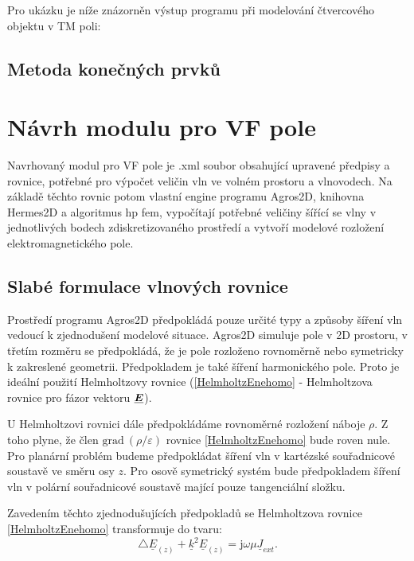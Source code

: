 \documentclass[12pt,a4paper,oneside]{article}
\numberwithin{equation}{section} %
\numberwithin{figure}{section} %
\numberwithin{table}{section} %
\newcommand{\mj}{\mathrm{j}} %
\renewcommand{\vec}[1]{\mbox{\boldmath$#1$}} %
\newcommand{\faz}[1]{{\underline{#1}}} %
\newcommand{\grad}{\mathrm{grad}\ }
\begin{document}
Pro ukázku je níže znázorněn výstup programu při modelování čtvercového objektu v TM poli:


\subsection{Metoda konečných prvků}
\label{FEM}

\newpage
\section{Návrh modulu pro VF pole}
Navrhovaný modul pro VF pole je .xml soubor obsahující upravené předpisy a rovnice, potřebné pro výpočet veličin vln ve volném prostoru a vlnovodech. Na základě těchto rovnic potom vlastní engine programu Agros2D, knihovna Hermes2D a algoritmus hp fem, vypočítají potřebné veličiny šířící se vlny v jednotlivých bodech zdiskretizovaného prostředí a vytvoří modelové rozložení elektromagnetického pole.

\subsection{Slabé formulace vlnových rovnice}
Prostředí programu Agros2D předpokládá pouze určité typy a způsoby šíření vln vedoucí k zjednodušení modelové situace. Agros2D simuluje pole v 2D prostoru, v třetím rozměru se předpokládá, že je pole rozloženo rovnoměrně nebo symetricky k zakreslené geometrii. Předpokladem je také šíření harmonického pole. Proto je ideální použití Helmholtzovy rovnice (\ref{HelmholtzEnehomo} - Helmholtzova rovnice pro fázor vektoru $\faz{\vec{E}}$).

U Helmholtzovi rovnici dále předpokládáme rovnoměrné rozložení náboje $\rho$. Z toho plyne, že člen $\grad \! \! (\rho / \varepsilon)$ rovnice \ref{HelmholtzEnehomo} bude roven nule. Pro planární problém budeme předpokládat šíření vln v kartézské souřadnicové soustavě ve směru osy $z$. Pro osově symetrický systém bude předpokladem šíření vln v polární souřadnicové soustavě mající pouze tangenciální složku.

Zavedením těchto zjednodušujících předpokladů se Helmholtzova rovnice \ref{HelmholtzEnehomo} transformuje do tvaru:
\begin{equation}
\label{HelmEasy}
\triangle \faz{E} _{(z)} + \faz{k} ^2 \faz{E} _{(z)} = \mj \omega \mu \faz{J} _{ext} .
\end{equation}
\end{document}
